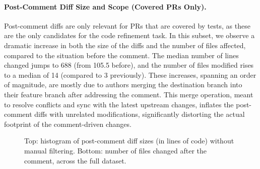 \paragraph{Post-Comment Diff Size and Scope (Covered PRs Only).}
Post-comment diffs are only relevant for PRs that are covered by tests, as these are the only
candidates for the code refinement task. In this subset, we observe a dramatic increase in both the
size of the diffs and the number of files affected, compared to the situation before the comment.
The median number of lines changed jumps to 688 (from 105.5 before), and the number of files
modified rises to a median of 14 (compared to 3 previously). These increases, spanning an
order of magnitude, are mostly due to authors merging the destination branch into their feature
branch after addressing the comment. This merge operation, meant to resolve conflicts and sync with
the latest upstream changes, inflates the post-comment diffs with unrelated modifications,
significantly distorting the actual footprint of the comment-driven changes.

\begin{figure}[!htbp]
	\centering
	\vspace{1em}

	\caption{Top: histogram of post-comment diff sizes (in lines of code) without manual filtering. Bottom: number of files changed after the comment, across the full dataset.}
	\label{fig:diff-after}
\end{figure}
\FloatBarrier

